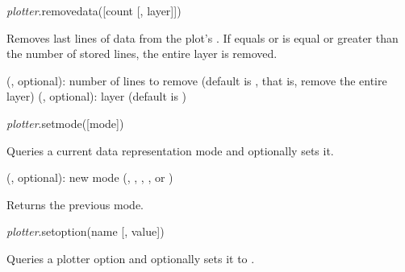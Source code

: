 \documentclass[a4paper,12pt,twoside,extrafontsizes]{memoir}
\begin{document}

\begin{luafuncprototype}
\emph{plotter}.removedata([count [, layer]])
\end{luafuncprototype}

\begin{funcdescr}
	Removes last  lines of data from the plot's . If  equals  or is equal or greater than the number of stored lines, the entire layer is removed.
\end{funcdescr}

\begin{funcparams}
	 (, optional): number of lines to remove (default is , that is, remove the entire layer)
	 (, optional): layer (default is )
\end{funcparams}


\begin{luafuncprototype}
\emph{plotter}.setmode([mode])
\end{luafuncprototype}

\begin{funcdescr}
	Queries a current data representation mode and optionally sets it.
\end{funcdescr}

\begin{funcparams}
	 (, optional): new mode (, , , ,  or )
\end{funcparams}

\begin{funcret}
	Returns the previous mode.
\end{funcret}


\begin{luafuncprototype}
\emph{plotter}.setoption(name [, value])
\end{luafuncprototype}

\begin{funcdescr}
	Queries a plotter option  and optionally sets it to .
\end{funcdescr}
\end{document}
